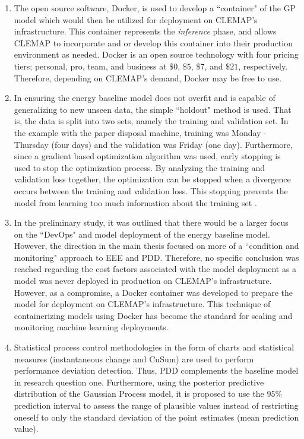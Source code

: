 \begin{enumerate}
    \item The open source software, Docker, is used to develop a ``container" of the GP model which would then be utilized for deployment on CLEMAP's infrastructure. This container represents the \textit{inference} phase, and allows CLEMAP to incorporate and or develop this container into their production environment as needed. Docker is an open source technology with four pricing tiers; personal, pro, team, and business at $\$0$, $\$5$, $\$7$, and $\$21$, respectively. Therefore, depending on CLEMAP's demand, Docker may be free to use. 
    
    \item In ensuring the energy baseline model does not overfit and is capable of generalizing to new unseen data, the simple ``holdout" method is used. That is, the data is split into two sets, namely the training and validation set. In the example with the paper disposal machine, training was Monday - Thursday (four days) and the validation was Friday (one day). Furthermore, since a gradient based optimization algorithm was used, early stopping is used to stop the optimization process. By analyzing the training and validation loss together, the optimization can be stopped when a divergence occurs between the training and validation loss. This stopping prevents the model from learning too much information about the training set \cite{pml1Book}. 
    
    \item In the preliminary study, it was outlined that there would be a larger focus on the ``DevOps" and model deployment of the energy baseline model. However, the direction in the main thesis focused on more of a ``condition and monitoring" approach to EEE and PDD. Therefore, no specific conclusion was reached regarding the cost factors associated with the model deployment as a model was never deployed in production on CLEMAP's infrastructure. However, as a compromise, a Docker container was developed to prepare the model for deployment on CLEMAP's infrastructure. This technique of containerizing models using Docker has become the standard for scaling and monitoring machine learning deployments. 
    
    \item Statistical process control methodologies in the form of charts and statistical measures (instantaneous change and CuSum) are used to perform performance deviation detection. Thus, PDD complements the baseline model in research question one. Furthermore, using the posterior predictive distribution of the Gaussian Process model, it is proposed to use the $95\%$ prediction interval to assess the range of plausible values instead of restricting oneself to only the standard deviation of the point estimates (mean prediction value).  
    

\end{enumerate}
